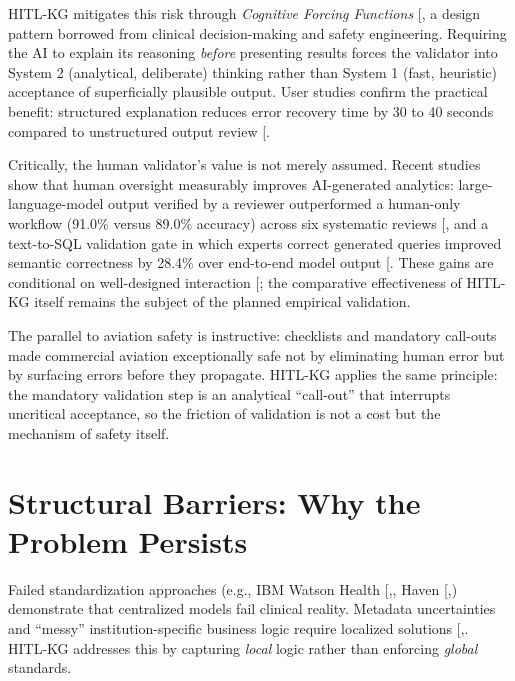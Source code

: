 \documentclass[
  american,
  11pt,
  letterpaper,
  oneside  ,captions=tableheading
]{scrartcl}
\begin{document}
HITL-KG mitigates this risk through \emph{Cognitive Forcing Functions}
{[}\citeproc{ref-ziletti2024}{38}{]}, a design pattern borrowed from
clinical decision-making and safety engineering. Requiring the AI to
explain its reasoning \emph{before} presenting results forces the
validator into System 2 (analytical, deliberate) thinking rather than
System 1 (fast, heuristic) acceptance of superficially plausible output.
User studies confirm the practical benefit: structured explanation
reduces error recovery time by 30 to 40 seconds compared to unstructured
output review {[}\citeproc{ref-ipeirotis2025}{77}{]}.

Critically, the human validator's value is not merely assumed. Recent
studies show that human oversight measurably improves AI-generated
analytics: large-language-model output verified by a reviewer
outperformed a human-only workflow (91.0\% versus 89.0\% accuracy)
across six systematic reviews {[}\citeproc{ref-gartlehner2025}{78}{]},
and a text-to-SQL validation gate in which experts correct generated
queries improved semantic correctness by 28.4\% over end-to-end model
output {[}\citeproc{ref-benzarti2026}{79}{]}. These gains are
conditional on well-designed interaction
{[}\citeproc{ref-ning2024}{80}{]}; the comparative effectiveness of
HITL-KG itself remains the subject of the planned empirical validation.

The parallel to aviation safety is instructive: checklists and mandatory
call-outs made commercial aviation exceptionally safe not by eliminating
human error but by surfacing errors before they propagate. HITL-KG
applies the same principle: the mandatory validation step is an
analytical ``call-out'' that interrupts uncritical acceptance, so the
friction of validation is not a cost but the mechanism of safety itself.

\section{Structural Barriers: Why the Problem
Persists}\label{structural-barriers-why-the-problem-persists}

Failed standardization approaches (e.g., IBM Watson Health
{[},\citeproc{ref-strickland2019}{82}{]},
Haven
{[},\citeproc{ref-acchiardo2021}{84}{]})
demonstrate that centralized models fail clinical reality. Metadata
uncertainties and ``messy'' institution-specific business logic require
localized solutions
{[},\citeproc{ref-strickland2019}{82}{]}.
HITL-KG addresses this by capturing \emph{local} logic rather than
enforcing \emph{global} standards.
\end{document}

